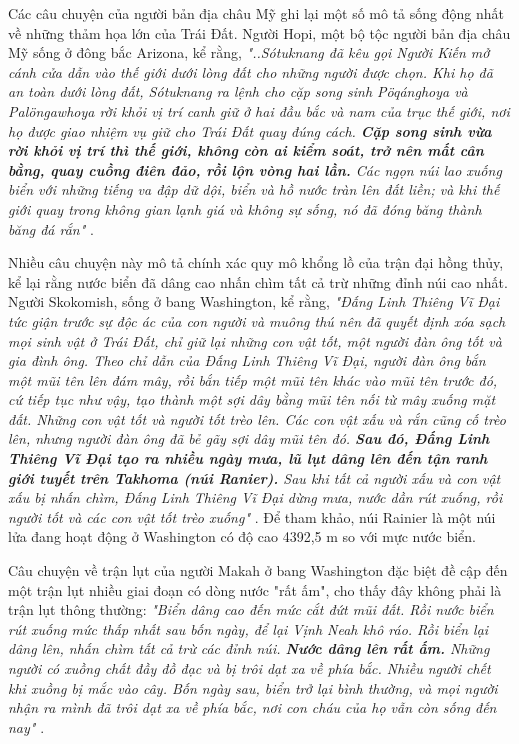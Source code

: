 \documentclass[10pt,twocolumn,letterpaper]{article}
\begin{document}
Các câu chuyện của người bản địa châu Mỹ ghi lại một số mô tả sống động nhất về những thảm họa lớn của Trái Đất. Người Hopi, một bộ tộc người bản địa châu Mỹ sống ở đông bắc Arizona, kể rằng, \textit{"..Sótuknang đã kêu gọi Người Kiến mở cánh cửa dẫn vào thế giới dưới lòng đất cho những người được chọn. Khi họ đã an toàn dưới lòng đất, Sótuknang ra lệnh cho cặp song sinh Pöqánghoya và Palöngawhoya rời khỏi vị trí canh giữ ở hai đầu bắc và nam của trục thế giới, nơi họ được giao nhiệm vụ giữ cho Trái Đất quay đúng cách. \textbf{Cặp song sinh vừa rời khỏi vị trí thì thế giới, không còn ai kiểm soát, trở nên mất cân bằng, quay cuồng điên đảo, rồi lộn vòng hai lần.} Các ngọn núi lao xuống biển với những tiếng va đập dữ dội, biển và hồ nước tràn lên đất liền; và khi thế giới quay trong không gian lạnh giá và không sự sống, nó đã đóng băng thành băng đá rắn"} \cite{4}.

Nhiều câu chuyện này mô tả chính xác quy mô khổng lồ của trận đại hồng thủy, kể lại rằng nước biển đã dâng cao nhấn chìm tất cả trừ những đỉnh núi cao nhất. Người Skokomish, sống ở bang Washington, kể rằng, \textit{"Đấng Linh Thiêng Vĩ Đại tức giận trước sự độc ác của con người và muông thú nên đã quyết định xóa sạch mọi sinh vật ở Trái Đất, chỉ giữ lại những con vật tốt, một người đàn ông tốt và gia đình ông. Theo chỉ dẫn của Đấng Linh Thiêng Vĩ Đại, người đàn ông bắn một mũi tên lên đám mây, rồi bắn tiếp một mũi tên khác vào mũi tên trước đó, cứ tiếp tục như vậy, tạo thành một sợi dây bằng mũi tên nối từ mây xuống mặt đất. Những con vật tốt và người tốt trèo lên. Các con vật xấu và rắn cũng cố trèo lên, nhưng người đàn ông đã bẻ gãy sợi dây mũi tên đó. \textbf{Sau đó, Đấng Linh Thiêng Vĩ Đại tạo ra nhiều ngày mưa, lũ lụt dâng lên đến tận ranh giới tuyết trên Takhoma (núi Ranier).} Sau khi tất cả người xấu và con vật xấu bị nhấn chìm, Đấng Linh Thiêng Vĩ Đại dừng mưa, nước dần rút xuống, rồi người tốt và các con vật tốt trèo xuống"} \cite{3}. Để tham khảo, núi Rainier là một núi lửa đang hoạt động ở Washington có độ cao 4392,5 m so với mực nước biển.

Câu chuyện về trận lụt của người Makah ở bang Washington đặc biệt đề cập đến một trận lụt nhiều giai đoạn có dòng nước "rất ấm", cho thấy đây không phải là trận lụt thông thường: \textit{"Biển dâng cao đến mức cắt đứt mũi đất. Rồi nước biển rút xuống mức thấp nhất sau bốn ngày, để lại Vịnh Neah khô ráo. Rồi biển lại dâng lên, nhấn chìm tất cả trừ các đỉnh núi. \textbf{Nước dâng lên rất ấm.} Những người có xuồng chất đầy đồ đạc và bị trôi dạt xa về phía bắc. Nhiều người chết khi xuồng bị mắc vào cây. Bốn ngày sau, biển trở lại bình thường, và mọi người nhận ra mình đã trôi dạt xa về phía bắc, nơi con cháu của họ vẫn còn sống đến nay"} \cite{3}.
\end{document}

